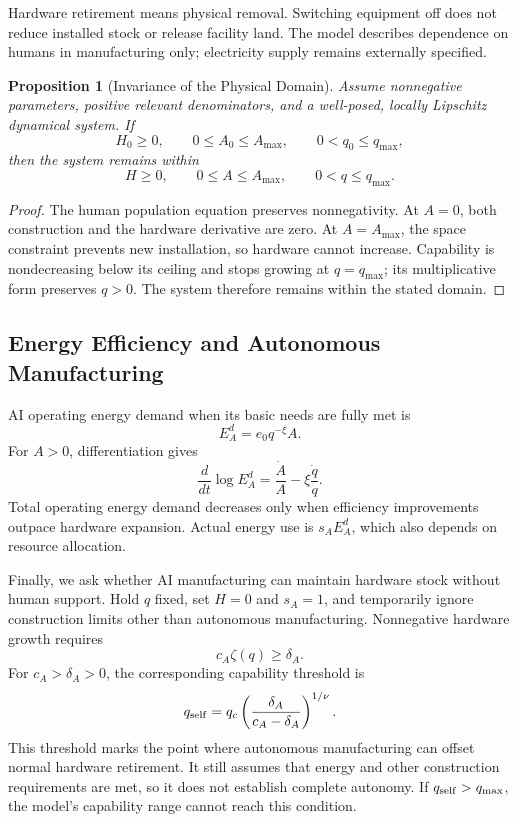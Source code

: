 \documentclass[12pt,a4paper]{article}
\newtheorem{proposition}{Proposition}[section]
\theoremstyle{remark}
\begin{document}
Hardware retirement means physical removal. Switching equipment off does not reduce installed stock or release facility land. The model describes dependence on humans in manufacturing only; electricity supply remains externally specified.




\begin{proposition}[Invariance of the Physical Domain]\label{prop:domain}
Assume nonnegative parameters, positive relevant denominators, and a well-posed, locally Lipschitz dynamical system. If
\[
H_0\ge0,\qquad 0\le A_0\le A_{\max},\qquad 0<q_0\le q_{\max},
\]
then the system remains within
\[
H\ge0,\qquad 0\le A\le A_{\max},\qquad 0<q\le q_{\max}.
\]
\end{proposition}
\begin{proof}
The human population equation preserves nonnegativity. At $A=0$, both construction and the hardware derivative are zero. At $A=A_{\max}$, the space constraint prevents new installation, so hardware cannot increase. Capability is nondecreasing below its ceiling and stops growing at $q=q_{\max}$; its multiplicative form preserves $q>0$. The system therefore remains within the stated domain.
\end{proof}

\subsection{Energy Efficiency and Autonomous Manufacturing}
AI operating energy demand when its basic needs are fully met is
\[
E_A^d=e_0q^{-\xi}A.
\]
For $A>0$, differentiation gives
\begin{equation}\label{eq:efficiency}
\frac{d}{dt}\log E_A^d=\frac{\dot A}{A}-\xi\frac{\dot q}{q}.
\end{equation}
Total operating energy demand decreases only when efficiency improvements outpace hardware expansion. Actual energy use is $s_AE_A^d$, which also depends on resource allocation.

Finally, we ask whether AI manufacturing can maintain hardware stock without human support. Hold $q$ fixed, set $H=0$ and $s_A=1$, and temporarily ignore construction limits other than autonomous manufacturing. Nonnegative hardware growth requires
\[
c_A\zeta(q)\ge\delta_A.
\]
For $c_A>\delta_A>0$, the corresponding capability threshold is
\begin{equation}\label{eq:self}
q_{\rm self}=q_c\left(\frac{\delta_A}{c_A-\delta_A}\right)^{1/\nu}.
\end{equation}
This threshold marks the point where autonomous manufacturing can offset normal hardware retirement. It still assumes that energy and other construction requirements are met, so it does not establish complete autonomy. If $q_{\rm self}>q_{\max}$, the model's capability range cannot reach this condition.
\end{document}
